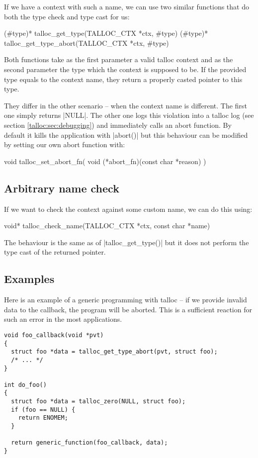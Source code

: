 If we have a context with such a name, we can use two similar functions that do
both the type check and type cast for us:

\begin{funcproto}
(#type)* talloc_get_type(TALLOC_CTX *ctx, #type)
(#type)* talloc_get_type_abort(TALLOC_CTX *ctx, #type)
\end{funcproto}
\funclistend
Both functions take as the first parameter a valid talloc context and as the
second parameter the type which the context is supposed to be. If the provided
type equals to the context name, they return a properly casted pointer to
this type.

They differ in the other scenario -- when the context name is different. The
first one simply returns |NULL|. The other one logs this violation into a talloc
log (see section \ref{talloc:sec:debugging}) and immediately calls an abort
function. By default it kills the application with |abort()| but this behaviour
can be modified by setting our own abort function with:

\begin{funcproto}
void talloc_set_abort_fn(
  void (*abort_fn)(const char *reason)
)
\end{funcproto}

\subsection{Arbitrary name check}

If we want to check the context against some custom name, we can do this using:

\begin{funcproto}
void* talloc_check_name(TALLOC_CTX *ctx, const char *name)
\end{funcproto}
\funclistend
The behaviour is the same as of |talloc_get_type()| but it does not perform the
type cast of the returned pointer.

\subsection{Examples}

Here is an example of a generic programming with talloc -- if we provide invalid
data to the callback, the program will be aborted. This is a sufficient
reaction for such an error in the most applications.

\begin{lstlisting}[caption={Dynamic type system \#1}]
void foo_callback(void *pvt)
{
  struct foo *data = talloc_get_type_abort(pvt, struct foo);
  /* ... */
}

int do_foo()
{
  struct foo *data = talloc_zero(NULL, struct foo);
  if (foo == NULL) {
    return ENOMEM;
  }

  return generic_function(foo_callback, data);
}
\end{lstlisting}

